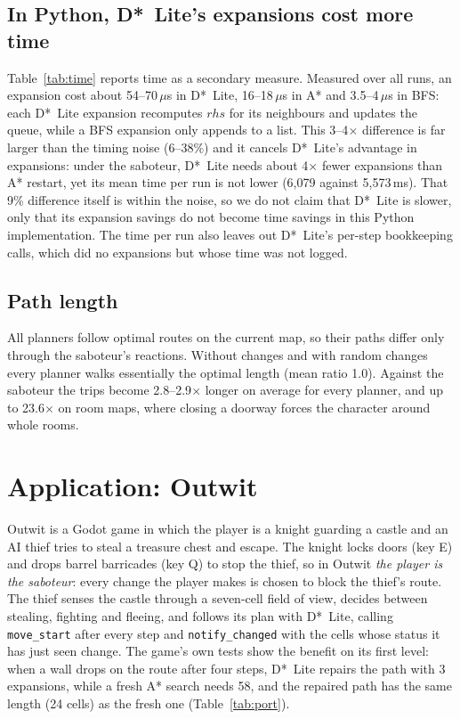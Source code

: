\documentclass[conference,12pt]{IEEEtran}
\newcommand{\dstar}{D*~Lite}
\begin{document}
\subsection{In Python, \dstar{}'s expansions cost more time}
Table~\ref{tab:time} reports time as a secondary measure. Measured over all runs, an expansion
cost about 54--70\,$\mu$s in \dstar{}, 16--18\,$\mu$s in A* and 3.5--4\,$\mu$s in BFS: each
\dstar{} expansion recomputes $\mathit{rhs}$ for its neighbours and updates the queue, while a BFS
expansion only appends to a list. This 3--4$\times$ difference is far larger than the timing
noise (6--38\%) and it cancels \dstar{}'s advantage in expansions: under the saboteur, \dstar{}
needs about 4$\times$ fewer expansions than A* restart, yet its mean time per run is not lower
(6{,}079 against 5{,}573\,ms). That 9\% difference itself is within the noise, so we do not claim
that \dstar{} is slower, only that its expansion savings do not become time savings in this Python
implementation. The time per run also leaves out \dstar{}'s per-step bookkeeping calls, which did
no expansions but whose time was not logged.



\subsection{Path length}
All planners follow optimal routes on the current map, so their paths differ only through the
saboteur's reactions. Without changes and with random changes every planner walks essentially
the optimal length (mean ratio 1.0). Against the saboteur the trips become 2.8--2.9$\times$ longer
on average for every planner, and up to 23.6$\times$ on room
maps, where closing a doorway forces the character around whole rooms.

\section{Application: Outwit}
\label{sec:outwit}

Outwit is a Godot game in which the player is a knight guarding a castle and an AI thief tries to
steal a treasure chest and escape. The knight locks doors (key E) and drops barrel barricades
(key Q) to stop the thief, so in Outwit \emph{the player is the saboteur}: every change the
player makes is chosen to block the thief's route. The thief senses the castle through a
seven-cell field of view, decides between stealing, fighting and fleeing, and follows its plan
with \dstar{}, calling \texttt{move\_start} after every step and \texttt{notify\_changed} with the
cells whose status it has just seen change. The game's own tests show the benefit on its first
level: when a wall drops on the route after four steps, \dstar{} repairs the path with 3
expansions, while a fresh A* search needs 58, and the repaired path has the same length (24
cells) as the fresh one (Table~\ref{tab:port}).
\end{document}
